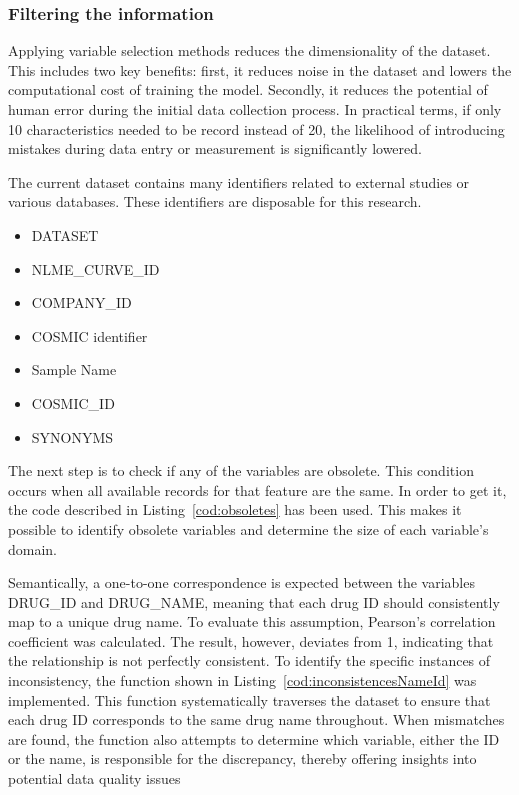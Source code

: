 \subsubsection{Filtering the information}

Applying variable selection methods reduces the dimensionality of the dataset. This includes two key benefits: first, it reduces noise in the dataset and lowers the computational cost of training the model. Secondly, it reduces the potential of human error during the initial data collection process. In practical terms, if only 10 characteristics needed to be record instead of 20, the likelihood of introducing mistakes during data entry or measurement is significantly lowered.

The current dataset contains many identifiers related to external studies or various databases. These identifiers are disposable for this research.

\begin{itemize}
    \item DATASET
    \item NLME\_CURVE\_ID
    \item COMPANY\_ID
    \item COSMIC identifier
    \item Sample Name
    \item COSMIC\_ID
    \item SYNONYMS
\end{itemize}

The next step is to check if any of the variables are obsolete. This condition occurs when all available records for that feature are the same. In order to get it, the code described in Listing~\ref{cod:obsoletes} has been used. This makes it possible to identify obsolete variables and determine the size of each variable's domain.

Semantically, a one-to-one correspondence is expected between the variables DRUG\_ID and DRUG\_NAME, meaning that each drug ID should consistently map to a unique drug name. To evaluate this assumption, Pearson's correlation coefficient was calculated. The result, however, deviates from 1, indicating that the relationship is not perfectly consistent. To identify the specific instances of inconsistency, the function shown in Listing~\ref{cod:inconsistencesNameId} was implemented. This function systematically traverses the dataset to ensure that each drug ID corresponds to the same drug name throughout. When mismatches are found, the function also attempts to determine which variable, either the ID or the name, is responsible for the discrepancy, thereby offering insights into potential data quality issues

